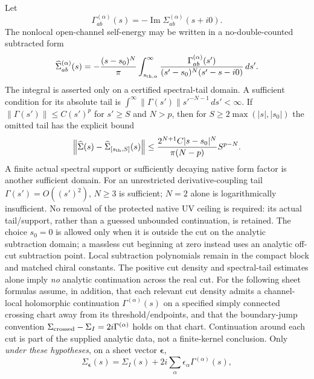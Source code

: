 \documentclass[12pt,a4paper]{article}
\begin{document}
\begin{theorem}
\label{p11:thm:schur-real-part-sheets-residues}
Let
\begin{equation}
\Gamma_{ab}^{(\alpha)}(s)=-\operatorname{Im}\Sigma_{ab}^{(\alpha)}(s+i0).
\end{equation}
The nonlocal open-channel self-energy may be written in a no-double-counted subtracted form
\begin{equation}
\label{p11:eq:subtracted-schur-dispersion}
\widehat\Sigma_{ab}^{(\alpha)}(s)=
-\frac{(s-s_0)^N}{\pi}
\int_{s_{{\rm th},\alpha}}^\infty
\frac{\Gamma_{ab}^{(\alpha)}(s')}{(s'-s_0)^N(s'-s-i0)}\,ds'.
\end{equation}
The integral is asserted only on a certified spectral-tail domain. A
sufficient condition for its absolute tail is
$\int^\infty\|\Gamma(s')\|s'^{-N-1}\,ds'<\infty$.
If $\|\Gamma(s')\|\le C(s')^p$ for $s'\ge S$ and $N>p$, then for
$S\ge2\max(|s|,|s_0|)$ the omitted tail has the explicit bound
\[
 \left\|\widehat\Sigma(s)-\widehat\Sigma_{[s_{\rm th},S]}(s)\right\|
 \le {2^{N+1}C|s-s_0|^N\over\pi(N-p)}S^{p-N}.
\]
A finite actual spectral support or sufficiently decaying native form factor
is another sufficient domain. For an unrestricted derivative-coupling tail
$\Gamma(s')=O((s')^2)$, $N\ge3$ is sufficient; $N=2$ alone is
logarithmically insufficient. No removal of the protected native UV ceiling
is required: its actual tail/support, rather than a guessed unbounded
continuation, is retained. The choice $s_0=0$ is allowed only when it is
outside the cut on the analytic subtraction domain; a massless cut beginning
at zero instead uses an analytic off-cut subtraction point. Local
subtraction polynomials remain in the compact block and matched chiral
constants. The positive cut density and spectral-tail estimates alone imply \emph{no} analytic continuation across the real cut. For the following sheet formulas assume, in addition, that each relevant cut density admits a channel-local holomorphic continuation \(\Gamma^{(\alpha)}(s)\) on a specified simply connected crossing chart away from its threshold/endpoints, and that the boundary-jump convention \(\Sigma_{\rm crossed}-\Sigma_I=2i\Gamma^{(\alpha)}\) holds on that chart. Continuation around each cut is part of the supplied analytic data, not a finite-kernel conclusion. Only \emph{under these hypotheses}, on a sheet vector \(\boldsymbol\epsilon\),
\begin{equation}
\label{p11:eq:sheet-continuation}
\Sigma_{\boldsymbol\epsilon}(s)=\Sigma_I(s)+2i\sum_\alpha \epsilon_\alpha\Gamma^{(\alpha)}(s),

\end{equation}
\end{theorem}
\end{document}
